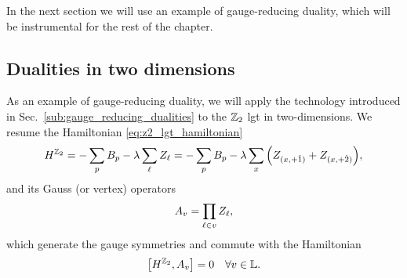 In the next section we will use an example of gauge-reducing duality, which will be instrumental for the rest of the chapter.


\subsection{Dualities in two dimensions}
\label{sub:dualities_in_two_dimensions}


As an example of gauge-reducing duality, we will apply the technology introduced in Sec.~\ref{sub:gauge_reducing_dualities} to the $\mathbb{Z}_2$ \ac{lgt} in two-dimensions.
We resume the Hamiltonian \eqref{eq:z2_lgt_hamiltonian}
\begin{equation*}
    H^{\mathbb{Z}_2}
    = - \sum_{p} B_p - \lambda \sum_{\ell} Z_{\ell}
    = - \sum_{p} B_p - \lambda \sum_{x} \qty(Z_{(x, +\hat{1})} + Z_{(x, +\hat{2})}),
\end{equation*}
and its Gauss (or vertex) operators
\begin{equation}
    A_v = \prod_{\ell \in v}  Z_{\ell},
\end{equation}
which generate the gauge symmetries and commute with the Hamiltonian
\begin{equation}
    \comm{H^{\Z_2}}{A_v} = 0 \quad \forall v \in \Lattice.
\end{equation}


